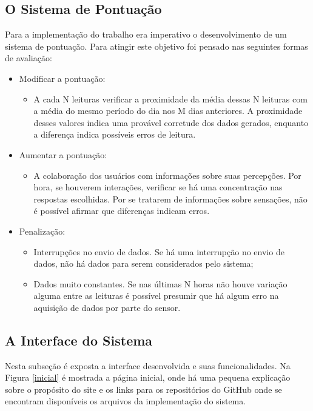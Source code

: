 \subsection{O Sistema de Pontuação}
Para a implementação do trabalho era imperativo o desenvolvimento de um sistema de pontuação. Para atingir este objetivo foi pensado nas seguintes formas de avaliação:
\begin{itemize}
  \item Modificar a pontuação:
    \begin{itemize}
      \item A cada N leituras verificar a proximidade da média dessas N leituras com a média do mesmo período do dia nos M dias anteriores. A proximidade desses valores indica uma provável corretude dos dados gerados, enquanto a diferença indica possíveis erros de leitura.
    \end{itemize}
  \item Aumentar a pontuação:
  \begin{itemize}
    \item A colaboração dos usuários com informações sobre suas percepções. Por hora, se houverem interações, verificar se há uma concentração nas respostas escolhidas. Por se tratarem de informações sobre sensações, não é possível afirmar que diferenças indicam erros.
  \end{itemize}
  \item Penalização:
    \begin{itemize}
      \item Interrupções no envio de dados. Se há uma interrupção no envio de dados, não há dados para serem considerados pelo sistema;
      \item Dados muito constantes. Se nas últimas N horas não houve variação alguma entre as leituras é possível presumir que há algum erro na aquisição de dados por parte do sensor.
    \end{itemize}
\end{itemize}

\subsection{A Interface do Sistema}
Nesta subseção é exposta a interface desenvolvida e suas funcionalidades. Na Figura \ref{inicial}
é mostrada a página inicial, onde há uma pequena explicação sobre o propósito do site e os links para os repositórios do GitHub onde se encontram disponíveis os arquivos da implementação do sistema.


